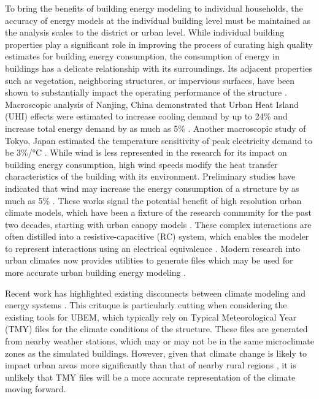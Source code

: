 \documentclass[preprint,review,12pt]{elsarticle}
\begin{document}
\begin{linenumbers}
To bring the benefits of building energy modeling to individual households, the accuracy of energy models at the individual building level must be maintained as the analysis scales to the district or urban level. While individual building properties play a significant role in improving the process of curating high quality estimates for building energy consumption, the consumption of energy in buildings has a delicate relationship with its surroundings. Its adjacent properties such as vegetation, neighboring structures, or impervious surfaces, have been shown to substantially impact the operating performance of the structure \cite{fung_impact_2006}\cite{toparlar_impact_2018}. Macroscopic analysis of Nanjing, China demonstrated that Urban Heat Island (UHI) effects were estimated to increase cooling demand by up to 24\% and increase total energy demand by as much as 5\% \cite{yang_impact_2020}. Another macroscopic study of Tokyo, Japan estimated the temperature sensitivity of peak electricity demand to be 3\%/°C \cite{kikegawa_development_2003}. While wind is less represented in the research for its impact on building energy consumption, high wind speeds modify the heat transfer characteristics of the building with its environment. Preliminary studies have indicated that wind may increase the energy consumption of a structure by as much as 5\% \cite{khoshdel_nikkho_quantifying_2017}. These works signal the potential benefit of high resolution urban climate models, which have been a fixture of the research community for the past two decades, starting with urban canopy models \cite{}. These complex interactions are often distilled into a resistive-capacitive (RC) system, which enables the modeler to represent interactions using an electrical equivalence \cite{bueno_resistance-capacitance_2012} \cite{nouvel_simstadt_2015}. Modern research into urban climates now provides utilities to generate files which may be used for more accurate urban building energy modeling \cite{bueno_urban_2013}. 

Recent work has highlighted existing disconnects between climate modeling and energy systems \cite{javanroodi_impacts_2019}\cite{craig_overcoming_2022}. This crituque is particularly cutting when considering the existing tools for UBEM, which typically rely on Typical Meteorological Year (TMY) files for the climate conditions of the structure. These files are generated from nearby weather stations, which may or may not be in the same microclimate zones as the simulated buildings. However, given that climate change is likely to impact urban areas more significantly than that of nearby rural regions \cite{huang_projecting_2019}, it is unlikely that TMY files will be a more accurate representation of the climate moving forward.


\end{linenumbers}
\end{document}

